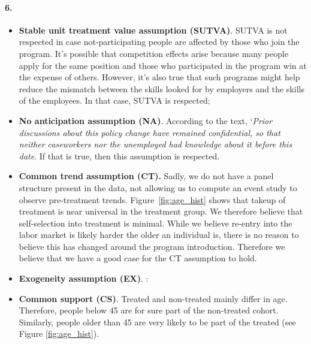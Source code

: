 \documentclass{scrartcl}
\begin{document}
\paragraph*{6.}

\begin{itemize}[label=$\blacktriangleright$]
    \item \textbf{Stable unit treatment value assumption (SUTVA)}. SUTVA is not respected in case not-participating people are affected by those who join the program. It's possible that competition effects arise because many people apply for the same position and those who participated in the program win at the expense of others. However, it's also true that such programs might help reduce the mismatch between the skills looked for by employers and the skills of the employees. In that case, SUTVA is respected;\

    \item \textbf{No anticipation assumption (NA)}. According to the text, `\textit{Prior discussions about this policy change have remained confidential, so that neither caseworkers nor the unemployed had knowledge about it before this date}. If that is true, then this assumption is respected. \

    \item \textbf{Common trend assumption (CT).} Sadly, we do not have a panel structure present in the data, not allowing us to compute an event study to observe pre-treatment trends. Figure~\ref{fig:age_hist} shows that takeup of treatment is near universal in the treatment group. We therefore believe that self-selection into treatment is minimal. While we believe re-entry into the labor market is likely harder the older an individual is, there is no reason to believe this has changed around the program introduction. Therefore we believe that we have a good case for the CT assumption to hold.\ 

    \item \textbf{Exogeneity assumption (EX)}. :\ 

    \item \textbf{Common support (CS)}. Treated and non-treated mainly differ in age. Therefore, people below 45 are for sure part of the non-treated cohort. Similarly, people older than 45 are very likely to be part of the treated (see Figure \ref{fig:age_hist}).
\end{itemize}
\end{document}
